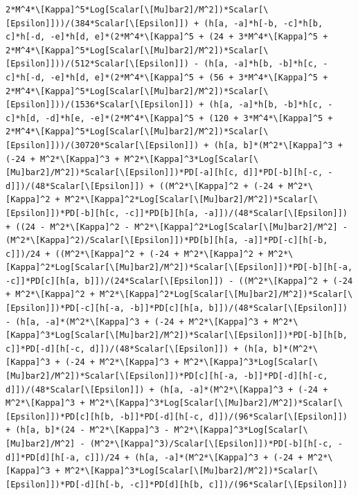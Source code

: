 \documentclass[11pt]{article}
\begin{document}
\begin{verbatim}
2*M^4*\[Kappa]^5*Log[Scalar[\[Mu]bar2]/M^2])*Scalar[\[Epsilon]]))/(384*Scalar[\[Epsilon]]) + (h[a, -a]*h[-b, -c]*h[b, c]*h[-d, -e]*h[d, e]*(2*M^4*\[Kappa]^5 + (24 + 3*M^4*\[Kappa]^5 + 2*M^4*\[Kappa]^5*Log[Scalar[\[Mu]bar2]/M^2])*Scalar[\[Epsilon]]))/(512*Scalar[\[Epsilon]]) - (h[a, -a]*h[b, -b]*h[c, -c]*h[-d, -e]*h[d, e]*(2*M^4*\[Kappa]^5 + (56 + 3*M^4*\[Kappa]^5 + 2*M^4*\[Kappa]^5*Log[Scalar[\[Mu]bar2]/M^2])*Scalar[\[Epsilon]]))/(1536*Scalar[\[Epsilon]]) + (h[a, -a]*h[b, -b]*h[c, -c]*h[d, -d]*h[e, -e]*(2*M^4*\[Kappa]^5 + (120 + 3*M^4*\[Kappa]^5 + 2*M^4*\[Kappa]^5*Log[Scalar[\[Mu]bar2]/M^2])*Scalar[\[Epsilon]]))/(30720*Scalar[\[Epsilon]]) + (h[a, b]*(M^2*\[Kappa]^3 + (-24 + M^2*\[Kappa]^3 + M^2*\[Kappa]^3*Log[Scalar[\[Mu]bar2]/M^2])*Scalar[\[Epsilon]])*PD[-a][h[c, d]]*PD[-b][h[-c, -d]])/(48*Scalar[\[Epsilon]]) + ((M^2*\[Kappa]^2 + (-24 + M^2*\[Kappa]^2 + M^2*\[Kappa]^2*Log[Scalar[\[Mu]bar2]/M^2])*Scalar[\[Epsilon]])*PD[-b][h[c, -c]]*PD[b][h[a, -a]])/(48*Scalar[\[Epsilon]]) + ((24 - M^2*\[Kappa]^2 - M^2*\[Kappa]^2*Log[Scalar[\[Mu]bar2]/M^2] - (M^2*\[Kappa]^2)/Scalar[\[Epsilon]])*PD[b][h[a, -a]]*PD[-c][h[-b, c]])/24 + ((M^2*\[Kappa]^2 + (-24 + M^2*\[Kappa]^2 + M^2*\[Kappa]^2*Log[Scalar[\[Mu]bar2]/M^2])*Scalar[\[Epsilon]])*PD[-b][h[-a, -c]]*PD[c][h[a, b]])/(24*Scalar[\[Epsilon]]) - ((M^2*\[Kappa]^2 + (-24 + M^2*\[Kappa]^2 + M^2*\[Kappa]^2*Log[Scalar[\[Mu]bar2]/M^2])*Scalar[\[Epsilon]])*PD[-c][h[-a, -b]]*PD[c][h[a, b]])/(48*Scalar[\[Epsilon]]) - (h[a, -a]*(M^2*\[Kappa]^3 + (-24 + M^2*\[Kappa]^3 + M^2*\[Kappa]^3*Log[Scalar[\[Mu]bar2]/M^2])*Scalar[\[Epsilon]])*PD[-b][h[b, c]]*PD[-d][h[-c, d]])/(48*Scalar[\[Epsilon]]) + (h[a, b]*(M^2*\[Kappa]^3 + (-24 + M^2*\[Kappa]^3 + M^2*\[Kappa]^3*Log[Scalar[\[Mu]bar2]/M^2])*Scalar[\[Epsilon]])*PD[c][h[-a, -b]]*PD[-d][h[-c, d]])/(48*Scalar[\[Epsilon]]) + (h[a, -a]*(M^2*\[Kappa]^3 + (-24 + M^2*\[Kappa]^3 + M^2*\[Kappa]^3*Log[Scalar[\[Mu]bar2]/M^2])*Scalar[\[Epsilon]])*PD[c][h[b, -b]]*PD[-d][h[-c, d]])/(96*Scalar[\[Epsilon]]) + (h[a, b]*(24 - M^2*\[Kappa]^3 - M^2*\[Kappa]^3*Log[Scalar[\[Mu]bar2]/M^2] - (M^2*\[Kappa]^3)/Scalar[\[Epsilon]])*PD[-b][h[-c, -d]]*PD[d][h[-a, c]])/24 + (h[a, -a]*(M^2*\[Kappa]^3 + (-24 + M^2*\[Kappa]^3 + M^2*\[Kappa]^3*Log[Scalar[\[Mu]bar2]/M^2])*Scalar[\[Epsilon]])*PD[-d][h[-b, -c]]*PD[d][h[b, c]])/(96*Scalar[\[Epsilon]])
\end{verbatim}
\end{document}

